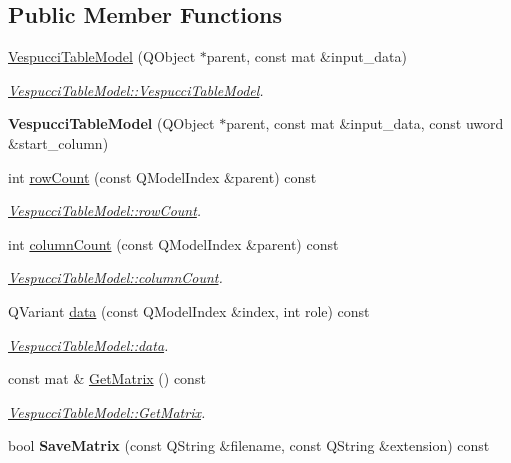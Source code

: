 \subsection*{Public Member Functions}
\begin{DoxyCompactItemize}
\item 
\hyperlink{class_vespucci_table_model_ab6f302e4e364e47fe702db1f8a7b86c4}{Vespucci\+Table\+Model} (Q\+Object $\ast$parent, const mat \&input\+\_\+data)
\begin{DoxyCompactList}\small\item\em \hyperlink{class_vespucci_table_model_ab6f302e4e364e47fe702db1f8a7b86c4}{Vespucci\+Table\+Model\+::\+Vespucci\+Table\+Model}. \end{DoxyCompactList}\item 
{\bfseries Vespucci\+Table\+Model} (Q\+Object $\ast$parent, const mat \&input\+\_\+data, const uword \&start\+\_\+column)\hypertarget{class_vespucci_table_model_aafd84dafe9be817cd6c51e7408000160}{}\label{class_vespucci_table_model_aafd84dafe9be817cd6c51e7408000160}

\item 
int \hyperlink{class_vespucci_table_model_a0820ddde1a8538e106c68dc2893fad51}{row\+Count} (const Q\+Model\+Index \&parent) const 
\begin{DoxyCompactList}\small\item\em \hyperlink{class_vespucci_table_model_a0820ddde1a8538e106c68dc2893fad51}{Vespucci\+Table\+Model\+::row\+Count}. \end{DoxyCompactList}\item 
int \hyperlink{class_vespucci_table_model_a4759aecfe949a158a56020b283d0d8b5}{column\+Count} (const Q\+Model\+Index \&parent) const 
\begin{DoxyCompactList}\small\item\em \hyperlink{class_vespucci_table_model_a4759aecfe949a158a56020b283d0d8b5}{Vespucci\+Table\+Model\+::column\+Count}. \end{DoxyCompactList}\item 
Q\+Variant \hyperlink{class_vespucci_table_model_ac2ad0341ad7c307ddbcd3959af0df56e}{data} (const Q\+Model\+Index \&index, int role) const 
\begin{DoxyCompactList}\small\item\em \hyperlink{class_vespucci_table_model_ac2ad0341ad7c307ddbcd3959af0df56e}{Vespucci\+Table\+Model\+::data}. \end{DoxyCompactList}\item 
const mat \& \hyperlink{class_vespucci_table_model_ad29830e8492b8870e3b2f3df7bc11a53}{Get\+Matrix} () const 
\begin{DoxyCompactList}\small\item\em \hyperlink{class_vespucci_table_model_ad29830e8492b8870e3b2f3df7bc11a53}{Vespucci\+Table\+Model\+::\+Get\+Matrix}. \end{DoxyCompactList}\item 
bool {\bfseries Save\+Matrix} (const Q\+String \&filename, const Q\+String \&extension) const \hypertarget{class_vespucci_table_model_aca9c3b99fdfd2df6cb7fe5fe0b07fd39}{}\label{class_vespucci_table_model_aca9c3b99fdfd2df6cb7fe5fe0b07fd39}


\end{DoxyCompactItemize}
